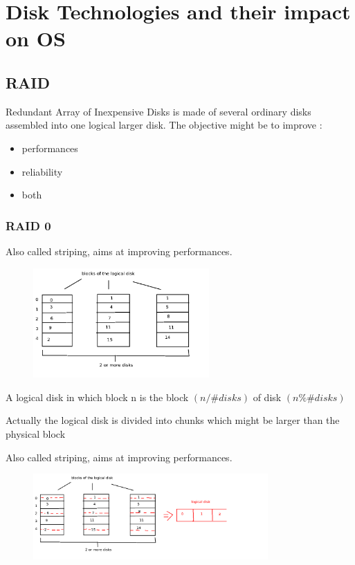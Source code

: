 
\chapter{Disk Technologies and their impact on OS}

\section{RAID}

Redundant Array of Inexpensive Disks is made of several ordinary disks assembled into one logical larger disk. The objective might be to improve :
\begin{itemize}
  \item performances
  \item reliability
  \item both
\end{itemize}

\subsection{RAID 0}

Also called striping, aims at improving performances.
\begin{figure}[h!]
  \begin{center}
    \includegraphics[width=0.6\textwidth]{raid_0.png}
  \end{center}
\end{figure}

A logical disk in which block n is the block $(n/\#disks)$ of disk $(n \% \#disks)$

Actually the logical disk is divided into chunks which might be larger than the physical block

Also called striping, aims at improving performances.
\begin{figure}[h!]
  \begin{center}
    \includegraphics[width=0.8\textwidth]{raid_0_chunks.png}
  \end{center}
\end{figure}


